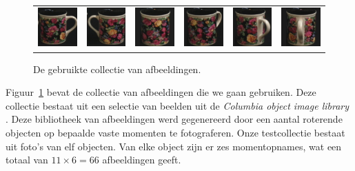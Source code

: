 \begin{figure}[p]
\begin{center}
\begin{tabular}{cccccc}
\includegraphics[width=2cm]{coil/beeld-60.eps} &
\includegraphics[width=2cm]{coil/beeld-61.eps} &
\includegraphics[width=2cm]{coil/beeld-62.eps} &
\includegraphics[width=2cm]{coil/beeld-63.eps} &
\includegraphics[width=2cm]{coil/beeld-64.eps} &
\includegraphics[width=2cm]{coil/beeld-65.eps} \\

\end{tabular}
\caption{\label{fig:testcollectie}De gebruikte collectie van afbeeldingen.}
\end{center}
\end{figure}

Figuur~\ref{fig:testcollectie} bevat de collectie van afbeeldingen die we gaan 
gebruiken. Deze collectie bestaat uit een selectie van beelden uit
de \emph{Columbia object image library} \cite{coil-100}. Deze bibliotheek van afbeeldingen 
werd gegenereerd 
door een aantal roterende objecten op bepaalde vaste momenten te fotograferen. 
Onze testcollectie bestaat uit foto's van elf objecten. Van elke object zijn
er zes momentopnames, wat een totaal van $11 \times 6 = 66$ afbeeldingen geeft.

